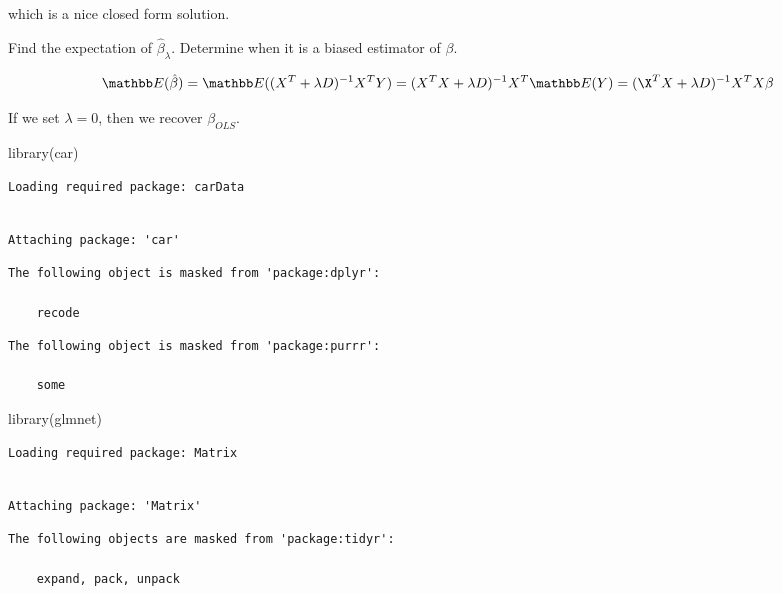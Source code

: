 \documentclass[
  letterpaper,
  DIV=11,
  numbers=noendperiod]{scrreport}
\newenvironment{Shaded}{\begin{snugshade}}{\end{snugshade}}
\newcommand{\FunctionTok}[1]{\textcolor[rgb]{0.28,0.35,0.67}{#1}}
\newcommand{\NormalTok}[1]{\textcolor[rgb]{0.00,0.23,0.31}{#1}}
\begin{document}
which is a nice closed form solution.

Find the expectation of \(\hat \beta_{\lambda}\). Determine when it is a
biased estimator of \(\beta\).

\[\mathbb E(\hat \beta) = \mathbb E((X^T + \lambda D)^{-1} X^TY) = (X^T X + \lambda D)^{-1} X^T \mathbb E(Y) \\
= (\X^TX + \lambda D)^{-1} X^T X \beta\]

If we set \(\lambda = 0\), then we recover \(\beta_{OLS}\).

\begin{Shaded}
\begin{Highlighting}[]
\FunctionTok{library}\NormalTok{(car)}
\end{Highlighting}
\end{Shaded}

\begin{verbatim}
Loading required package: carData
\end{verbatim}

\begin{verbatim}

Attaching package: 'car'
\end{verbatim}

\begin{verbatim}
The following object is masked from 'package:dplyr':

    recode
\end{verbatim}

\begin{verbatim}
The following object is masked from 'package:purrr':

    some
\end{verbatim}

\begin{Shaded}
\begin{Highlighting}[]
\FunctionTok{library}\NormalTok{(glmnet)}
\end{Highlighting}
\end{Shaded}

\begin{verbatim}
Loading required package: Matrix
\end{verbatim}

\begin{verbatim}

Attaching package: 'Matrix'
\end{verbatim}

\begin{verbatim}
The following objects are masked from 'package:tidyr':

    expand, pack, unpack
\end{verbatim}
\end{document}
